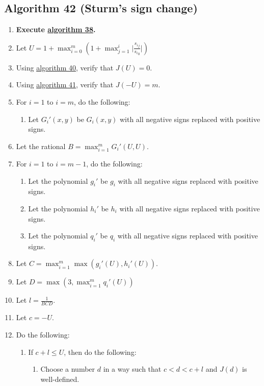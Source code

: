\documentclass[twocolumn]{article}
\begin{document}
		\subsection{Algorithm 42 (Sturm's sign change)}\label{sec:algorithm 42}
			\begin{enumerate}
				\item \textbf{Execute \hyperref[sec:algorithm 38]{algorithm 38}.}
				\item Let $U=1+\max_{i=0}^m\left(1+\max_{j=1}^i\lvert\frac{{s_i}_j}{{s_i}_0}\rvert\right)$
				\item Using \hyperref[sec:algorithm 40]{algorithm 40}, verify that $J(U)=0$.
				\item Using \hyperref[sec:algorithm 41]{algorithm 41}, verify that $J(-U)=m$.
				\item For $i=1$ to $i=m$, do the following:
				\begin{enumerate}
					\item Let $G_i'(x,y)$ be $G_i(x,y)$ with all negative signs replaced with positive signs.
				\end{enumerate}
				\item Let the rational $B=\max_{i=1}^m G_i'(U,U)$.
				\item For $i=1$ to $i=m-1$, do the following:
				\begin{enumerate}
					\item Let the polynomial $g_i'$ be $g_i$ with all negative signs replaced with positive signs.
					\item Let the polynomial $h_i'$ be $h_i$ with all negative signs replaced with positive signs.
					\item Let the polynomial $q_i'$ be $q_i$ with all negative signs replaced with positive signs.
				\end{enumerate}
				\item Let $C=\max_{i=1}^m \max(g_i'(U),h_i'(U))$.
				\item Let $D=\max(3, \max_{i=1}^m q_i'(U))$
				\item Let $l=\frac{1}{BCD}$.
				\item Let $c=-U$.
				\item Do the following:
				\begin{enumerate}
					\item If $c+l\le U$, then do the following:
					\begin{enumerate}
						\item Choose a number $d$ in a way such that $c<d<c+l$ and $J(d)$ is well-defined.
					\end{enumerate}

\end{enumerate}
\end{enumerate}
\end{document}
